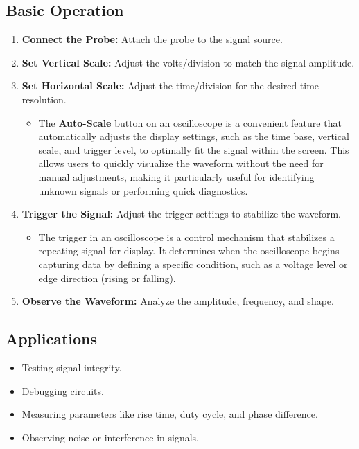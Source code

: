 \documentclass[12pt]{article}
\begin{document}
\subsection{Basic Operation}
\begin{enumerate}
    \item \textbf{Connect the Probe:} Attach the probe to the signal source.
    \item \textbf{Set Vertical Scale:} Adjust the volts/division to match the signal amplitude.
    \item \textbf{Set Horizontal Scale:} Adjust the time/division for the desired time resolution.
    \begin{itemize}
        \item The \textbf{Auto-Scale} button on an oscilloscope is a convenient feature that automatically adjusts the display settings, such as the time base, vertical scale, and trigger level, to optimally fit the signal within the screen. This allows users to quickly visualize the waveform without the need for manual adjustments, making it particularly useful for identifying unknown signals or performing quick diagnostics.
    \end{itemize}
    \item \textbf{Trigger the Signal:} Adjust the trigger settings to stabilize the waveform.
    \begin{itemize}
        \item The trigger in an oscilloscope is a control mechanism that stabilizes a repeating signal for display. It determines when the oscilloscope begins capturing data by defining a specific condition, such as a voltage level or edge direction (rising or falling).
        

    \end{itemize}
    \item \textbf{Observe the Waveform:} Analyze the amplitude, frequency, and shape.
\end{enumerate}

\subsection{Applications}
\begin{itemize}
    \item Testing signal integrity.
    \item Debugging circuits.
    \item Measuring parameters like rise time, duty cycle, and phase difference.
    \item Observing noise or interference in signals.
\end{itemize}
\end{document}
